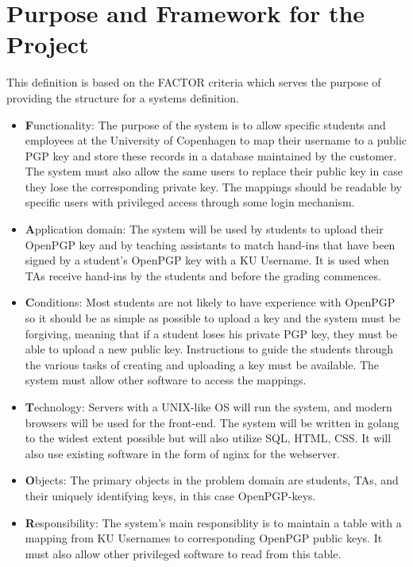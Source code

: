 \documentclass[11pt,a4paper]{report}
\begin{document}
\section{Purpose and Framework for the Project}\label{sec:Purpose_Framework}
This definition is based on the FACTOR criteria which serves the purpose of providing the structure for a systems definition.
\begin{itemize}
\item \textbf{F}unctionality: The purpose of the system is to allow specific students and employees at the University of Copenhagen to map their username to a public PGP key and store these records in a database maintained by the customer. The system must also allow the same users to replace their public key in case they lose the corresponding private key. The mappings should be readable by specific users with privileged access through some login mechanism.
\item \textbf{A}pplication domain: The system will be used by students to upload their OpenPGP key and by teaching assistants to match hand-ins that have been signed by a student's OpenPGP key with a KU Username. It is used when TAs receive hand-ins by the students and before the grading commences.
\item \textbf{C}onditions: Most students are not likely to have experience with OpenPGP so it should be as simple as possible to upload a key and the system must be forgiving, meaning that if a student loses his private PGP key, they must be able to upload a new public key. Instructions to guide the students through the various tasks of creating and uploading a key must be available. The system must allow other software to access the mappings.
\item \textbf{T}echnology: Servers with a UNIX-like OS will run the system, and modern browsers will be used for the front-end. The system will be written in golang to the widest extent possible but will also utilize SQL, HTML, CSS. It will also use existing software in the form of nginx for the webserver.
\item \textbf{O}bjects: The primary objects in the problem domain are students, TAs, and their uniquely identifying keys, in this case OpenPGP-keys.
\item \textbf{R}esponsibility: The system's main responsiblity is to maintain a table with a mapping from KU Usernames to corresponding OpenPGP public keys. It must also allow other privileged software to read from this table.
\end{itemize}
\end{document}
